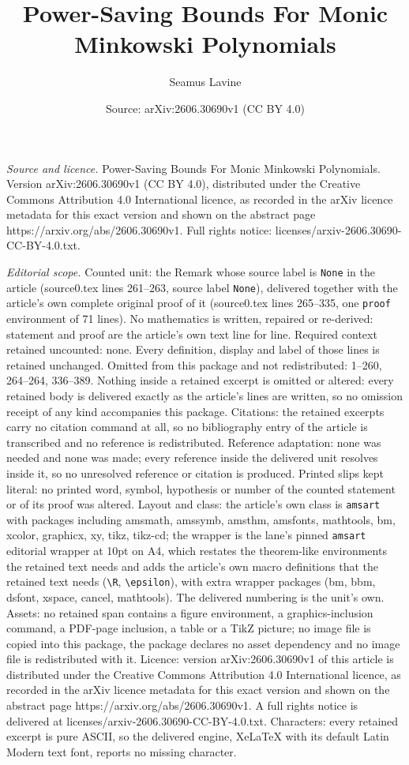 \documentclass[10pt,a4paper]{amsart}
\title[Power-Saving Bounds For Monic Minkowski Polynomials]{Power-Saving Bounds For Monic Minkowski Polynomials}
\author{Seamus Lavine}
\date{Source: arXiv:2606.30690v1 (CC BY 4.0)}
\begin{document}
\maketitle

\noindent\emph{Source and licence.} Power-Saving Bounds For Monic Minkowski Polynomials. Version arXiv:2606.30690v1 (CC BY 4.0), distributed under the Creative Commons Attribution 4.0 International licence, as recorded in the arXiv licence metadata for this exact version and shown on the abstract page https://arxiv.org/abs/2606.30690v1. Full rights notice: licenses/arxiv-2606.30690-CC-BY-4.0.txt.\par\smallskip

\noindent\textit{Editorial scope.} Counted unit: the Remark whose source label is \texttt{None} in the article (source0.tex lines 261--263, source label \texttt{None}), delivered together with the article's own complete original proof of it (source0.tex lines 265--335, one \texttt{proof} environment of 71 lines). No mathematics is written, repaired or re-derived: statement and proof are the article's own text line for line. Required context retained uncounted: none. Every definition, display and label of those lines is retained unchanged. Omitted from this package and not redistributed: 1--260, 264--264, 336--389. Nothing inside a retained excerpt is omitted or altered: every retained body is delivered exactly as the article's lines are written, so no omission receipt of any kind accompanies this package. Citations: the retained excerpts carry no citation command at all, so no bibliography entry of the article is transcribed and no reference is redistributed. Reference adaptation: none was needed and none was made; every reference inside the delivered unit resolves inside it, so no unresolved reference or citation is produced. Printed slips kept literal: no printed word, symbol, hypothesis or number of the counted statement or of its proof was altered. Layout and class: the article's own class is \texttt{amsart} with packages including amsmath, amssymb, amsthm, amsfonts, mathtools, bm, xcolor, graphicx, xy, tikz, tikz-cd; the wrapper is the lane's pinned \texttt{amsart} editorial wrapper at 10pt on A4, which restates the theorem-like environments the retained text needs and adds the article's own macro definitions that the retained text needs (\texttt{\textbackslash R}, \texttt{\textbackslash epsilon}), with extra wrapper packages (bm, bbm, dsfont, xspace, cancel, mathtools). The delivered numbering is the unit's own. Assets: no retained span contains a figure environment, a graphics-inclusion command, a PDF-page inclusion, a table or a TikZ picture; no image file is copied into this package, the package declares no asset dependency and no image file is redistributed with it. Licence: version arXiv:2606.30690v1 of this article is distributed under the Creative Commons Attribution 4.0 International licence, as recorded in the arXiv licence metadata for this exact version and shown on the abstract page https://arxiv.org/abs/2606.30690v1. A full rights notice is delivered at licenses/arxiv-2606.30690-CC-BY-4.0.txt. Characters: every retained excerpt is pure ASCII, so the delivered engine, XeLaTeX with its default Latin Modern text font, reports no missing character.
\end{document}
